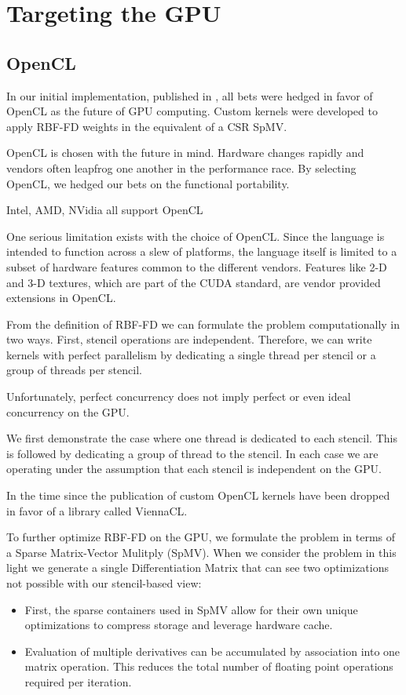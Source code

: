 \documentclass{report}
\begin{document}
\section{Targeting the GPU}

\subsection{OpenCL}
In our initial implementation, published in \cite{BolligFlyerErlebacher2012}, all bets were hedged in favor of OpenCL as the future of GPU computing. Custom kernels were developed to apply RBF-FD weights in the equivalent of a CSR SpMV. 

OpenCL is chosen with the future in mind. Hardware changes rapidly and vendors often leapfrog one another in the performance race. By selecting OpenCL, we hedged our bets on the functional portability. 

Intel, AMD, NVidia all support OpenCL

One serious limitation exists with the choice of OpenCL. Since the language is intended to function across a slew of platforms, the language itself is limited to a subset of hardware features common to the different vendors. Features like 2-D and 3-D textures, which are part of the CUDA standard, are vendor provided extensions in OpenCL. 


From the definition of RBF-FD we can formulate the problem computationally in two ways. First, stencil operations are independent. Therefore, we can write kernels with perfect parallelism by dedicating a single thread per stencil or a group of threads per stencil.  

Unfortunately, perfect concurrency does not imply perfect or even ideal concurrency on the GPU. 

We first demonstrate the case where one thread is dedicated to each stencil. This is followed by dedicating a group of thread to the stencil. In each case we are operating under the assumption that each stencil is independent on the GPU. 


In the time since the publication of \cite{BolligFlyerErlebacher2012} custom OpenCL kernels have been dropped in favor of a library called ViennaCL. 

To further optimize RBF-FD on the GPU, we formulate the problem in terms of a Sparse Matrix-Vector Mulitply (SpMV). When we consider the problem in this light we generate a single Differentiation Matrix that can see two optimizations not possible with our stencil-based view: 
\begin{itemize} 
\item First, the sparse containers used in SpMV allow for their own unique optimizations to compress storage and leverage hardware cache.
\item Evaluation of multiple derivatives can be accumulated by association into one matrix operation. This reduces the total number of floating point operations required per iteration. 
\end{itemize}
\end{document}
